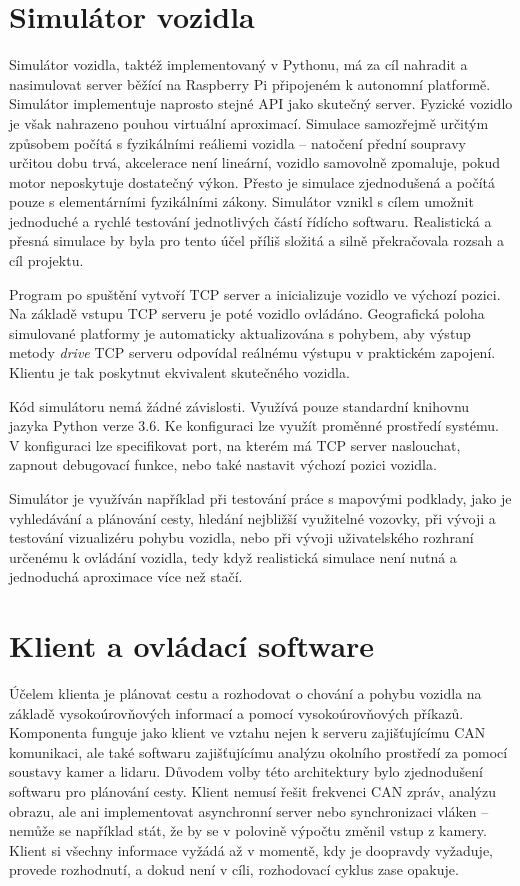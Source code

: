 \documentclass[czech,bachelor,dept460,male,cpp,cpdeclaration]{diploma}
\begin{document}
\section{Simulátor vozidla}

Simulátor vozidla, taktéž implementovaný v Pythonu, má za cíl nahradit a nasimulovat server běžící na Raspberry Pi připojeném
k autonomní platformě. Simulátor implementuje naprosto stejné API jako skutečný server. Fyzické vozidlo je však nahrazeno pouhou
virtuální aproximací. Simulace samozřejmě určitým způsobem počítá s fyzikálními reáliemi vozidla -- natočení přední soupravy 
určitou dobu trvá, akcelerace není lineární, vozidlo samovolně zpomaluje, pokud motor neposkytuje dostatečný výkon. Přesto je 
simulace zjednodušená a počítá pouze s elementárními fyzikálními zákony. Simulátor vznikl s cílem umožnit jednoduché a rychlé 
testování jednotlivých částí řídícho softwaru. Realistická a přesná simulace by byla pro tento účel příliš složitá a silně 
překračovala rozsah a cíl projektu.

Program po spuštění vytvoří TCP server a inicializuje vozidlo ve výchozí pozici. Na základě vstupu TCP serveru je poté vozidlo 
ovládáno. Geografická poloha simulované platformy je automaticky aktualizována s pohybem, aby výstup metody \emph{drive} TCP 
serveru odpovídal reálnému výstupu v praktickém zapojení. Klientu je tak poskytnut ekvivalent skutečného vozidla. 

Kód simulátoru nemá žádné závislosti. Využívá pouze standardní knihovnu jazyka Python verze 3.6. Ke konfiguraci lze využít 
proměnné prostředí systému. V konfiguraci lze specifikovat port, na kterém má TCP server naslouchat, zapnout debugovací funkce, 
nebo také nastavit výchozí pozici vozidla.

Simulátor je využíván například při testování práce s mapovými podklady, jako je vyhledávání a plánování cesty, hledání nejbližší
využitelné vozovky, při vývoji a testování vizualizéru pohybu vozidla, nebo při vývoji uživatelského rozhraní určenému k ovládání
vozidla, tedy když realistická simulace není nutná a jednoduchá aproximace více než stačí.

\section{Klient a ovládací software}

Účelem klienta je plánovat cestu a rozhodovat o chování a pohybu vozidla na základě vysokoúrovňových informací a pomocí 
vysokoúrovňových příkazů. Komponenta funguje jako klient ve vztahu nejen k serveru zajišťujícímu CAN komunikaci, ale také 
softwaru zajišťujícímu analýzu okolního prostředí za pomocí soustavy kamer a lidaru. Důvodem volby této architektury bylo 
zjednodušení softwaru pro plánování cesty. Klient nemusí řešit frekvenci CAN zpráv, analýzu obrazu, ale ani implementovat 
asynchronní server nebo synchronizaci vláken -- nemůže se například stát, že by se v polovině výpočtu změnil vstup z kamery.
Klient si všechny informace vyžádá až v momentě, kdy je doopravdy vyžaduje, provede rozhodnutí, a dokud není v cíli, rozhodovací 
cyklus zase opakuje.
\end{document}
